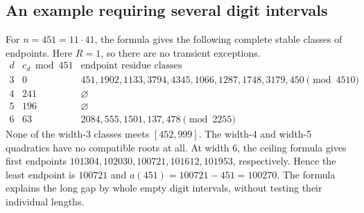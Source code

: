 \subsection{An example requiring several digit intervals}
For $n=451=11\cdot41$, the formula gives the following complete stable
classes of endpoints. Here $R=1$, so there are no transient exceptions.
\[
\begin{array}{c|c|l}
d&c_d\bmod451&\text{endpoint residue classes}\\\hline
3&0&451,1902,1133,3794,4345,1066,1287,1748,3179,450\pmod{4510}\\
4&241&\varnothing\\
5&196&\varnothing\\
6&63&2084,555,1501,137,478\pmod{2255}
\end{array}
\]
None of the width-3 classes meets $[452,999]$. The width-4 and width-5
quadratics have no compatible roots at all. At width 6, the ceiling
formula gives first endpoints $101304,102030,100721,101612,101953$,
respectively. Hence the least endpoint is $100721$ and
$a(451)=100721-451=100270$. The formula explains the long gap by
whole empty digit intervals, without testing their individual lengths.
